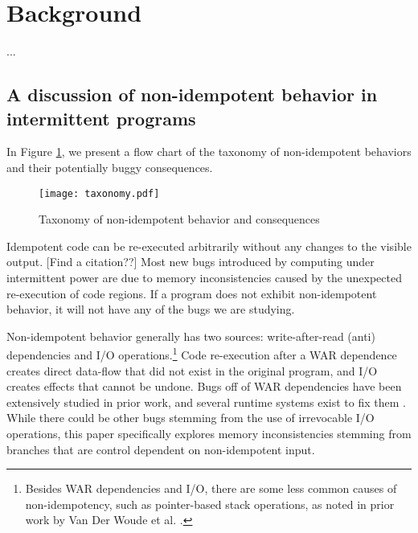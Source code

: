 \section{Background}

...

\subsection{A discussion of non-idempotent behavior in intermittent programs}

In Figure \ref{fig:tax}, we present a flow chart of the taxonomy of non-idempotent behaviors and their potentially buggy consequences. 

\begin{figure}[ht]
\centering
\texttt{[image: taxonomy.pdf]}
\caption{Taxonomy of non-idempotent behavior and consequences}
\label{fig:tax}
\end{figure}
 Idempotent code can be re-executed arbitrarily without any changes to the visible output. [Find a citation??] Most new bugs introduced by computing under intermittent power are due to memory inconsistencies caused by the unexpected re-execution of code regions. If a program does not exhibit non-idempotent behavior, it will not have any of the bugs we are studying.

 Non-idempotent behavior generally has two sources: write-after-read (anti) dependencies and I/O operations.\footnote{Besides WAR dependencies and I/O, there are some less common causes of non-idempotency, such as pointer-based stack operations, as noted in prior work by Van Der Woude et al. \cite{ratchet}.} Code re-execution after a WAR dependence creates direct data-flow that did not exist in the original program, and I/O creates effects that cannot be undone. Bugs off of WAR dependencies have been extensively studied in prior work, and several runtime systems exist to fix them \cite{ratchet} \cite{alpaca} \cite{dino}. While there could be other bugs stemming from the use of irrevocable I/O operations, this paper specifically explores memory inconsistencies stemming from branches that are control dependent on non-idempotent input.

